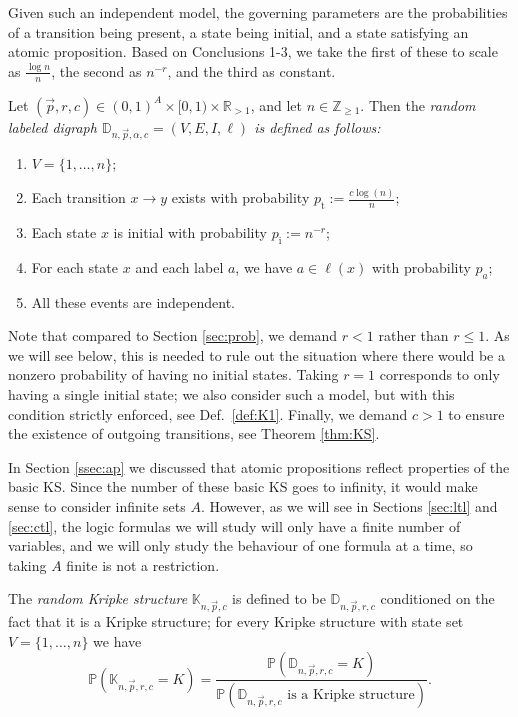 \documentclass[runngingheads]{llncs}
\newcommand\recht\operatorname
\begin{document}
Given such an independent model, the governing parameters are the probabilities of a transition being present, a state being initial, and a state satisfying an atomic proposition. Based on Conclusions 1-3, we take the first of these to scale as $\tfrac{\log n}{n}$, the second as $n^{-r}$, and the third as constant.

\begin{definition}
Let $(\vec{p},r,c) \in (0,1)^{A} \times [0,1) \times \mathbb{R}_{>1}$, and let $n \in \mathbb{Z}_{\geq 1}$. Then the \emph{random labeled digraph $\mathbb{D}_{n,\vec{p},\alpha,c} = (V,E,I,\ell)$ is defined as follows:}
\begin{enumerate}
\item $V = \{1,\ldots,n\}$;
\item Each transition $x \rightarrow y$ exists with probability $p_{\recht{t}} := \tfrac{c\log(n)}{n}$;
\item Each state $x$ is initial with probability $p_{\recht{i}} := n^{-r}$;
\item For each state $x$ and each label $a$, we have $a \in \ell(x)$ with probability $p_a$;
\item All these events are independent.
\end{enumerate}
\end{definition}

Note that compared to Section \ref{sec:prob}, we demand $r < 1$ rather than $r \leq 1$. As we will see below, this is needed to rule out the situation where there would be a nonzero probability of having no initial states. Taking $r = 1$  corresponds to only having a single initial state; we also consider such a model, but with this condition strictly enforced, see Def.~\ref{def:K1}. Finally, we demand $c > 1$ to ensure the existence of outgoing transitions, see Theorem \ref{thm:KS}.

\begin{remark} \label{rem:fixA}
In Section \ref{ssec:ap} we discussed that atomic propositions reflect properties of the basic KS. Since the number of these basic KS goes to infinity, it would make sense to consider infinite sets $A$. However, as we will see in Sections \ref{sec:ltl} and \ref{sec:ctl}, the logic formulas we will study will only have a finite number of variables, and we will only study the behaviour of one formula at a time, so taking $A$ finite is not a restriction.
\end{remark}

\begin{definition}
The \emph{random Kripke structure} $\mathbb{K}_{n,\vec{p},c}$ is defined to be $\mathbb{D}_{n,\vec{p},r,c}$ conditioned on the fact that it is a Kripke structure; for every Kripke structure with state set $V = \{1,\ldots,n\}$ we have
\[
\mathbb{P}(\mathbb{K}_{n,\vec{p},r,c} = K) = \frac{\mathbb{P}(\mathbb{D}_{n,\vec{p},r,c} = K)}{\mathbb{P}(\mathbb{D}_{n,\vec{p},r,c} \textrm{ is a Kripke structure})}.
\]
\end{definition}
\end{document}

